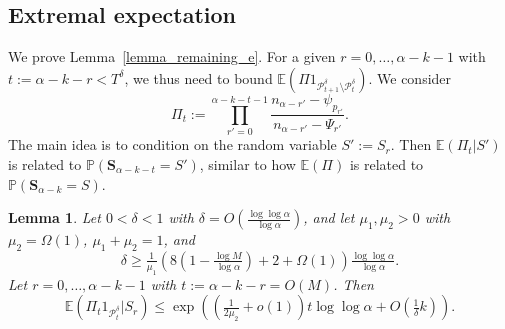 \documentclass{article}
\theoremstyle{plain}
\theoremstyle{remark}
\theoremstyle{plain}
\newtheorem{lemma}[theorem]{Lemma}
\numberwithin{equation}{section}
\begin{document}
	\subsection{Extremal expectation}\label{subsection_proof_rpe}
	
	We prove Lemma~\ref{lemma_remaining_e}. For a given $r=0,\ldots,\alpha-k-1$ with $t:=\alpha-k-r<T^{\delta}$, we thus need to bound $\mathbb{E}(\Pi1_{\mathcal{P}_{t+1}^{\delta}\setminus\mathcal{P}_t^{\delta}})$. We consider $$\Pi_t:=\prod_{r'=0}^{\alpha-k-t-1}\frac{n_{\alpha-r'}-\psi_{p_{r'}}}{n_{\alpha-r'}-\Psi_{r'}}.$$ The main idea is to condition on the random variable $S':=S_r$. Then $\mathbb{E}(\Pi_t|S')$ is related to $\mathbb{P}(\boldsymbol{S}_{\alpha-k-t}=S')$, similar to how $\mathbb{E}(\Pi)$ is related to $\mathbb{P}(\boldsymbol{S}_{\alpha-k}=S)$.
	
	\begin{lemma}\label{lemma_recycle}
		Let $0<\delta<1$ with $\delta=O(\tfrac{\log\log\alpha}{\log\alpha})$, and let $\mu_1,\mu_2>0$ with $\mu_2=\Omega(1)$, $\mu_1+\mu_2=1$, and
		\begin{equation}\label{equation_recycle}
			\delta\geq\tfrac1{\mu_1}\left(8\left(1-\tfrac{\log M}{\log\alpha}\right)+2+\Omega(1)\right)\tfrac{\log\log\alpha}{\log\alpha}.
		\end{equation}
		Let $r=0,\ldots,\alpha-k-1$ with $t:=\alpha-k-r=O(M)$. Then $$\mathbb{E}(\Pi_t1_{\mathcal{P}_t^{\delta}}|S_r)\leq\exp\left((\tfrac{1}{2\mu_2}+o(1))t\log\log\alpha+O(\tfrac1{\delta}k)\right).$$
	\end{lemma}
	
\end{document}
